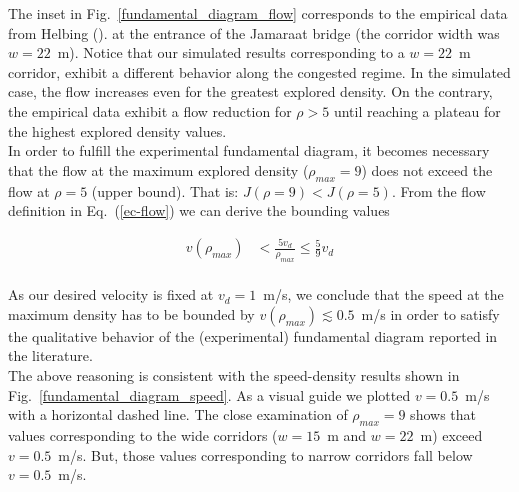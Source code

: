 The inset in Fig.~\ref{fundamental_diagram_flow} corresponds to the empirical data from Helbing (\cite{helbing3}). at the entrance of the Jamaraat bridge (the corridor width was $w=22$~m). Notice that our simulated results corresponding to a $w=22$~m corridor, exhibit a different behavior along the congested regime. In the simulated case, the flow increases even for the greatest explored density. On the contrary, the empirical data exhibit a flow reduction for $\rho > 5$ until reaching a plateau for the highest explored density values.  \\

{ \color{red} In order to fulfill the experimental fundamental diagram, it becomes necessary that the flow at the maximum explored density ($\rho_{max} = 9$) does not exceed the flow at $\rho = 5$ (upper bound). That is:  $J(\rho = 9) < J(\rho = 5)$. From the flow definition in Eq.~(\ref{ec-flow}) we can derive the bounding values }

\begin{align*} 
v(\rho_{max}) &< \frac{5v_d}{\rho_{max}} \leq \frac{5}{9} v_d \\
\end{align*}

As our desired velocity is fixed at $v_d = 1$~m/s, we conclude that the speed at the maximum density has to be bounded by $v(\rho_{max}) \lesssim  0.5$~m/s in order to satisfy the qualitative behavior of the (experimental) fundamental diagram reported in the literature.\\

The above reasoning is consistent with the speed-density results shown in Fig.~\ref{fundamental_diagram_speed}. As a visual guide we plotted $v=0.5$~m/s with a horizontal dashed line. The close examination of $\rho_{max} = 9$ shows that values corresponding to the wide corridors ($w=15$~m and $w=22$~m) exceed $v=0.5$~m/s. But, those values corresponding to narrow corridors fall below $v=0.5$~m/s. \\

